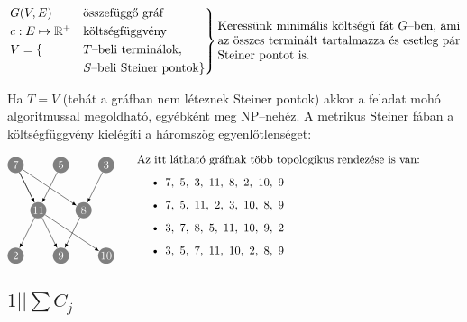 \[
\begin{rcases}
G(V,E) &\mbox{összefüggő gráf} \\
c:E \mapsto \mathbb{R}^+ &\mbox{költségfüggvény} \\
V = \{ &T\mbox{--beli terminálok}, \\
	   &S\mbox{--beli Steiner pontok}\}
\end{rcases}
\parbox[L]{7cm}{ Keressünk minimális költségű fát $G$--ben, ami az összes
terminált tartalmazza és esetleg pár Steiner pontot is.} \]

Ha $T=V$ (tehát a gráfban nem léteznek Steiner pontok) akkor a feladat mohó
algoritmussal megoldható, egyébként meg NP--nehéz. A metrikus Steiner fában
a költségfüggvény kielégíti a háromszög egyenlőtlenséget:


\[ \parbox[l]{4cm}{
\begin{tikzpicture}[scale=0.7]
  \tikzset{ p/.style={circle,white,fill=gray,inner sep=0pt,minimum size=0.5cm},
  }
  \node[p] (7) at (-2, 2) {$7$};
  \node[p] (5) at (0, 2) {$5$};
  \node[p] (3) at (2, 2) {$3$};
  \node[p] (11) at (-1, 0) {$11$};
  \node[p] (8) at (1, 0) {$8$};
  \node[p] (2) at (-2, -2) {$2$};
  \node[p] (9) at (0, -2) {$9$};
  \node[p] (10) at (2, -2) {$10$};
  
  \draw[-latex] (7) -- (11) node [midway, above] {};
  \draw[-latex] (7) -- (8) node [midway, above] {};
  \draw[-latex] (5) -- (11) node [midway, above] {};
  \draw[-latex] (3) -- (8) node [midway, above] {};
  \draw[-latex] (7) -- (11) node [midway, above] {};
  \draw[-latex] (11) -- (2) node [midway, above] {};
  \draw[-latex] (11) -- (9) node [midway, above] {};
  \draw[-latex] (11) -- (10) node [midway, above] {};
  \draw[-latex] (8) -- (9) node [midway, above] {};
\end{tikzpicture}}
\parbox[l]{10cm}{
Az itt látható gráfnak több topologikus rendezése is van:

\begin{itemize}
  \item $7,~5,~3,~11,~8,~2,~10,~9$
  \item $7,~5,~11,~2,~3,~10,~8,~9$
  \item $3,~7,~8,~5,~11,~10,~9,~2$
  \item $3,~5,~7,~11,~10,~2,~8,~9$
\end{itemize}
}\]

\subsection{ \texorpdfstring {$ 1||\sum C_j$} {1||SumCj} }


